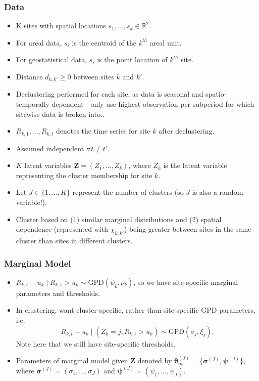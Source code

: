 \documentclass{article}
\numberwithin{equation}{section}
\begin{document}
\subsubsection{Data}

\begin{itemize}
  \item K sites with spatial locations $s_1, \ldots, s_k \in \mathbb{R}^2$.
  \item For areal data, $s_i$ is the centroid of the $k^{th}$ areal unit. 
  \item For geostatistical data, $s_i$ is the point location of $k^{th}$ site. 
  \item Distance $d_{k, k'} \ge 0$ between sites $k$ and $k'$.
  \item Declustering performed for each site, as data is seasonal and spatio-temporally dependent - only use highest observation per subperiod for which sitewise data is broken into..
  \item $R_{k, 1}, \ldots, R_{k, t}$ denotes the time series for site $k$ after declustering. 
  \item Assumed independent $\forall t \ne t'$. 
  \item $K$ latent variables $\bm{Z} = (Z_1, \ldots, Z_k)$, where $Z_k$ is the latent variable representing the cluster membership for site $k$.
  \item Let $J \in \{1, \ldots, K\}$ represent the number of clusters (so $J$ is also a random variable!).
  \item Cluster based on (1) similar marginal distributions and (2) spatial dependence (represented with $\chi_{k, k'}$) being greater between sites in the same cluster than sites in different clusters. 
\end{itemize}

\subsubsection{Marginal Model}

\begin{itemize}
  \item $R_{k, t} - u_k \mid R_{k, t} > u_k \sim \text{GPD}(\psi_k, \nu_k)$, so we have site-specific marginal parameters and thresholds. 
  \item In clustering, want cluster-specific, rather than site-specific GPD parameters, i.e.\ 
  \[
    R_{k, t} - u_k \mid (Z_k = j, R_{k, t} > u_k) \sim \text{GPD}(\sigma_j, \xi_j).
  \]
  Note here that we still have site-specific thresholds. 
\item Parameters of marginal model given $\bm{Z}$ denoted by $\bm{\theta}_m^{(J)} = \{\bm{\sigma}^{(J)}, \bm{\psi}^{(J)}\}$, where $\bm{\sigma}^{(J)} = (\sigma_1, \ldots, \sigma_J)$ and $\bm{\psi}^{(J)} = (\psi_1, \ldots, \psi_J)$. 
\end{itemize}
\end{document}
